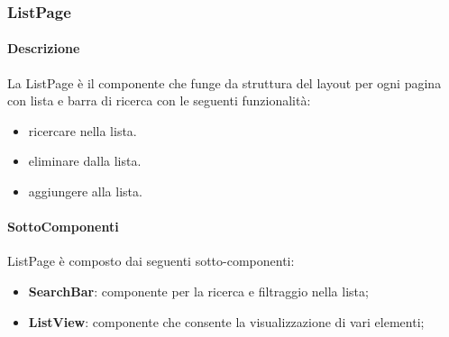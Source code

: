\subsubsection{ListPage} 
\label{sec:ListPage}
\paragraph{Descrizione}
La ListPage è il componente che funge da struttura del layout per ogni pagina con lista e barra di ricerca con le seguenti funzionalità:
\begin{itemize}
    \item ricercare nella lista.
    \item eliminare dalla lista.
    \item aggiungere alla lista.
\end{itemize}  
\paragraph{SottoComponenti}
ListPage è composto dai seguenti sotto-componenti:
\begin{itemize}
    \item \textbf{SearchBar}: componente per la ricerca e filtraggio nella lista;
    \item \textbf{ListView}: componente che consente la visualizzazione di vari elementi;
\end{itemize}